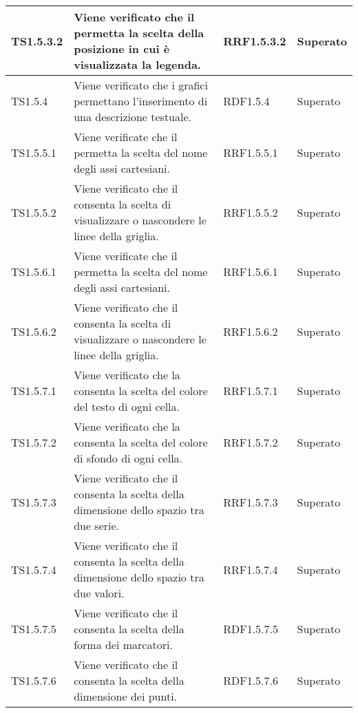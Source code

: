 \begin{longtabu}{| X[0.5] | X | X[0.5] | X[0.4] |}
TS1.5.3.2 & Viene verificato che il  permetta la scelta della posizione in cui è visualizzata la legenda. & RRF1.5.3.2 & Superato\\ \hline

TS1.5.4 & Viene verificato che i grafici permettano l'inserimento di una descrizione testuale. & RDF1.5.4 & Superato\\ \hline

TS1.5.5.1 & Viene verificate che il  permetta la scelta del nome degli assi cartesiani. & RRF1.5.5.1 & Superato\\ \hline

TS1.5.5.2 & Viene verificato che il  consenta la scelta di visualizzare o nascondere le linee della griglia.& RRF1.5.5.2 & Superato\\ \hline

TS1.5.6.1 & Viene verificate che il  permetta la scelta del nome degli assi cartesiani. & RRF1.5.6.1 & Superato\\ \hline

TS1.5.6.2 &	Viene verificato che il  consenta la scelta di visualizzare o nascondere le linee della griglia. & RRF1.5.6.2 & Superato\\ \hline

TS1.5.7.1 & Viene verificato che la  consenta la scelta del colore del testo di ogni cella. & RRF1.5.7.1 & Superato\\ \hline

TS1.5.7.2 & Viene verificato che la  consenta la scelta del colore di sfondo di ogni cella. & RRF1.5.7.2 & Superato\\ \hline

TS1.5.7.3 & Viene verificato che il  consenta la scelta della dimensione dello spazio tra due serie. & RRF1.5.7.3 & Superato\\ \hline

TS1.5.7.4 & Viene verificato che il  consenta la scelta della dimensione dello spazio tra due valori. & RRF1.5.7.4 & Superato\\ \hline

TS1.5.7.5 & Viene verificato che il  consenta la scelta della forma dei marcatori. & RDF1.5.7.5 & Superato\\ \hline

TS1.5.7.6 & Viene verificato che il  consenta la scelta della dimensione dei punti.&
RDF1.5.7.6 & Superato\\ \hline


\end{longtabu}
